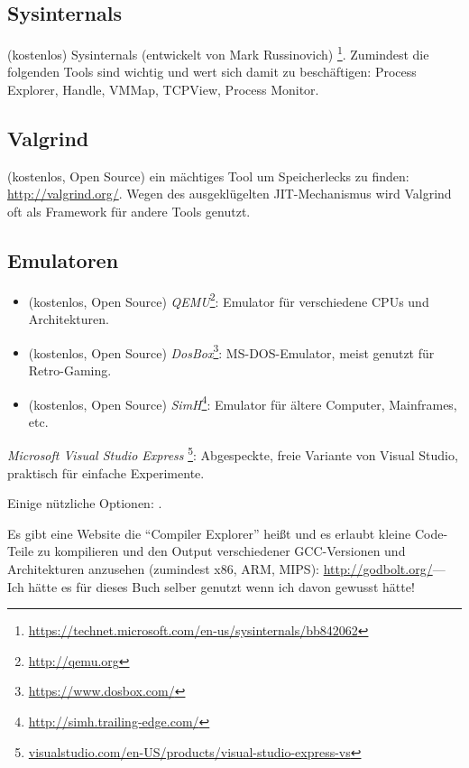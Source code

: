 \subsection{Sysinternals}

(kostenlos) Sysinternals (entwickelt von Mark Russinovich)
\footnote{\url{https://technet.microsoft.com/en-us/sysinternals/bb842062}}.
Zumindest die folgenden Tools sind wichtig und wert sich damit zu beschäftigen:
Process Explorer, Handle, VMMap, TCPView, Process Monitor.

\subsection{Valgrind}

(kostenlos, Open Source) ein mächtiges Tool um Speicherlecks zu finden: \url{http://valgrind.org/}.
Wegen des ausgeklügelten \ac{JIT}-Mechanismus wird Valgrind oft als Framework für andere Tools genutzt.


\subsection{Emulatoren}

\begin{itemize}
\item (kostenlos, Open Source) \emph{QEMU}\footnote{\url{http://qemu.org}}: Emulator für verschiedene CPUs und Architekturen.

\item (kostenlos, Open Source) \emph{DosBox}\footnote{\url{https://www.dosbox.com/}}: MS-DOS-Emulator, meist genutzt für Retro-Gaming.

\item (kostenlos, Open Source) \emph{SimH}\footnote{\url{http://simh.trailing-edge.com/}}: Emulator für ältere Computer, Mainframes, etc.
\end{itemize}


\emph{Microsoft Visual Studio Express}
\footnote{\href{http://go.yurichev.com/17034}{visualstudio.com/en-US/products/visual-studio-express-vs}}:
Abgespeckte, freie Variante von Visual Studio, praktisch für einfache Experimente.

Einige nützliche Optionen: .

Es gibt eine Website die ``Compiler Explorer'' heißt und es erlaubt kleine Code-Teile zu kompilieren
und den Output verschiedener GCC-Versionen und Architekturen anzusehen (zumindest x86, ARM, MIPS):
\url{http://godbolt.org/}---Ich hätte es für dieses Buch selber genutzt wenn ich davon gewusst hätte!

